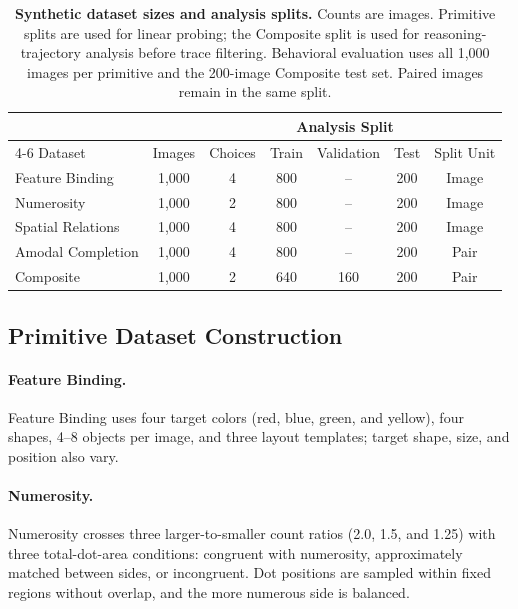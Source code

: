 \documentclass{article} %
\begin{document}
\begin{table}[H]
    \centering
    \small
    \renewcommand{\arraystretch}{1.05}
    \setlength{\tabcolsep}{2pt}
    \caption{\textbf{Synthetic dataset sizes and analysis splits.} Counts are images. Primitive splits are used for linear probing; the Composite split is used for reasoning-trajectory analysis before trace filtering. Behavioral evaluation uses all 1,000 images per primitive and the 200-image Composite test set. Paired images remain in the same split.}
    \label{tab:dataset_splits}
    \begin{tabular*}{\textwidth}{@{\extracolsep{\fill}}lcccccc@{}}
        \toprule
        & & & \multicolumn{3}{c}{\textbf{Analysis Split}} & \\
        \cmidrule(lr){4-6}
        Dataset & Images & Choices & Train & Validation & Test & Split Unit \\
        \midrule
        Feature Binding & 1,000 & 4 & 800 & -- & 200 & Image \\
        Numerosity & 1,000 & 2 & 800 & -- & 200 & Image \\
        Spatial Relations & 1,000 & 4 & 800 & -- & 200 & Image \\
        Amodal Completion & 1,000 & 4 & 800 & -- & 200 & Pair \\
        Composite & 1,000 & 2 & 640 & 160 & 200 & Pair \\
        \bottomrule
    \end{tabular*}
\end{table}


\subsection{Primitive Dataset Construction}

\paragraph{Feature Binding.}
Feature Binding uses four target colors (red, blue, green, and yellow), four shapes, 4--8 objects per image, and three layout templates; target shape, size, and position also vary.

\paragraph{Numerosity.}
Numerosity crosses three larger-to-smaller count ratios (2.0, 1.5, and 1.25) with three total-dot-area conditions: congruent with numerosity, approximately matched between sides, or incongruent. Dot positions are sampled within fixed regions without overlap, and the more numerous side is balanced.
\end{document}
